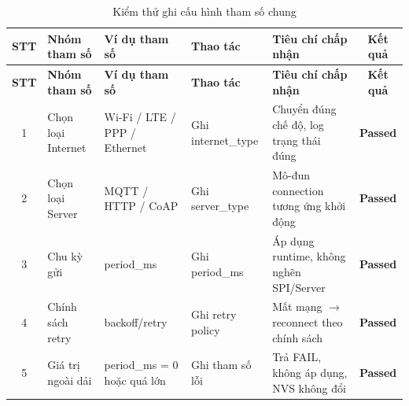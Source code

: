         \begin{longtable}{|c|p{2cm}|p{3.5cm}|p{2.5cm}|p{4cm}|c|}
            \caption{Kiểm thử ghi cấu hình tham số chung}
            \label{tab:test_write_config} \\
            \hline
            \textbf{STT} & \textbf{Nhóm tham số} & \textbf{Ví dụ tham số} & \textbf{Thao tác} & \textbf{Tiêu chí chấp nhận} & \textbf{Kết quả} \\ \hline
            \endfirsthead

            \hline
            \textbf{STT} & \textbf{Nhóm tham số} & \textbf{Ví dụ tham số} & \textbf{Thao tác} & \textbf{Tiêu chí chấp nhận} & \textbf{Kết quả} \\ \hline
            \endhead

            \hline
            \endfoot
            \endlastfoot

            1 & Chọn loại Internet & Wi-Fi / LTE / PPP / Ethernet & Ghi internet\_type & Chuyển đúng chế độ, log trạng thái đúng & \textcolor{modern_blue}{\textbf{Passed}} \\ \hline
            2 & Chọn loại Server & MQTT / HTTP / CoAP & Ghi server\_type & Mô-đun connection tương ứng khởi động & \textcolor{modern_blue}{\textbf{Passed}} \\ \hline
            3 & Chu kỳ gửi & period\_ms & Ghi period\_ms & Áp dụng runtime, không nghẽn SPI/Server & \textcolor{modern_blue}{\textbf{Passed}} \\ \hline
            4 & Chính sách retry & backoff/retry & Ghi retry policy & Mất mạng $\rightarrow$ reconnect theo chính sách & \textcolor{modern_blue}{\textbf{Passed}} \\ \hline
            5 & Giá trị ngoài dải & period\_ms = 0 hoặc quá lớn & Ghi tham số lỗi & Trả FAIL, không áp dụng, NVS không đổi & \textcolor{modern_blue}{\textbf{Passed}} \\ \hline
        \end{longtable}

